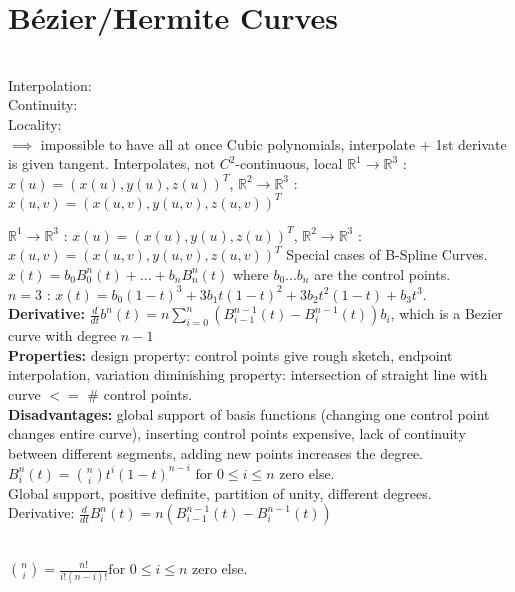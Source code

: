 \section{Bézier/Hermite Curves}
 \\
Interpolation: \\
Continuity: \\
Locality:  \\
$\implies$ impossible to have all at once
Cubic polynomials, interpolate + 1st derivate is given tangent. Interpolates, not $C^2$-continuous, local
 $\mathbb{R}^1 \to \mathbb{R}^3$ : $x(u) = (x(u), y(u), z(u))^T$, $\mathbb{R}^2 \to \mathbb{R}^3$ : $x(u,v) = (x(u,v), y(u,v), z(u,v))^T$

 $\mathbb{R}^1 \to \mathbb{R}^3$ : $x(u) = (x(u), y(u), z(u))^T$, $\mathbb{R}^2 \to \mathbb{R}^3$ : $x(u,v) = (x(u,v), y(u,v), z(u,v))^T$
Special cases of B-Spline Curves. \\
${x}(t) = b_0 B_0^n(t) + \dots + b_n B_n^n(t)$ where $b_0 ...b_n$ are the control points. 
\\
$n = 3 $ : ${x}(t) = b_0(1-t)^3 + 3b_1t(1-t)^2 + 3b_2t^2(1-t) + b_3t^3$. 
\\
\textbf{Derivative:} $\frac{d}{dt} b^n(t) = n \sum_{i=0}^{n} \left( B_{i-1}^{n-1}(t) - B_i^{n-1}(t) \right) b_i$, which is a Bezier curve with degree $n - 1$\\
\textbf{Properties:} design property: control points give rough sketch, endpoint interpolation, variation diminishing property: intersection of straight line with curve $<=$ \# control points.\\
\textbf{Disadvantages:} global support of basis functions (changing one control point changes entire curve), inserting control points expensive, lack of continuity between different segments, adding new points increases the degree.\\
$B_i^n(t) = \binom{n}{i} t^i (1 - t)^{n-i} \text{ for } 0 \leq i \leq n$ zero else. 
\\
Global support, positive definite, partition of unity, different degrees. 
\\
Derivative: $\frac{d}{dt} B_i^n(t) = n \left( B_{i-1}^{n-1}(t) - B_i^{n-1}(t) \right)$


\\
$\binom{n}{i} = \frac{n!}{i!(n-i)!} \text{for } 0 \leq i \leq n$ zero else.


